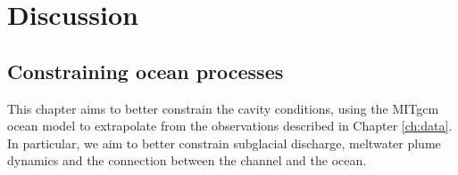 
\section{Discussion} \label{ocean_discuss}



\subsection{Constraining ocean processes}

This chapter aims to better constrain the cavity conditions, using the MITgcm ocean model to extrapolate from the observations described in Chapter \ref{ch:data}. In particular, we aim to better constrain subglacial discharge, meltwater plume dynamics and the connection between the channel and the ocean.

